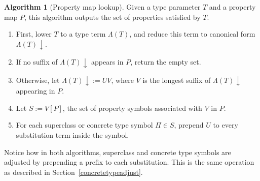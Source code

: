 \documentclass[a4paper,headsepline,bibliography=totoc,toc=flat,fleqn,twoside=semi]{scrbook}
\theoremstyle{definition}
\theoremstyle{definition}
\theoremstyle{definition}
\newtheorem{algorithm}{Algorithm}[chapter]
\begin{document}
\begin{algorithm}[Property map lookup]\label{propmaplookupalgo} Given a type parameter $T$ and a property map $P$, this
algorithm outputs the set of properties satisfied by $T$.

\begin{enumerate}
\item First, lower $T$ to a type term $\Lambda(T)$, and reduce this term to canonical form $\Lambda(T){\downarrow}$.
\item If no suffix of $\Lambda(T){\downarrow}$ appears in $P$, return the empty set.
\item Otherwise, let $\Lambda(T){\downarrow}:=UV$, where $V$ is the longest suffix of $\Lambda(T){\downarrow}$ appearing in $P$.
\item Let $S:=V[P]$, the set of property symbols associated with $V$ in $P$.
\item For each superclass or concrete type symbol $\Pi\in S$, prepend $U$ to every substitution
term inside the symbol.
\end{enumerate}
\end{algorithm}
Notice how in both algorithms, superclass and concrete type symbols are adjusted by prepending a
prefix to each substitution. This is the same operation as described in
Section~\ref{concretetypeadjust}.
\end{document}
